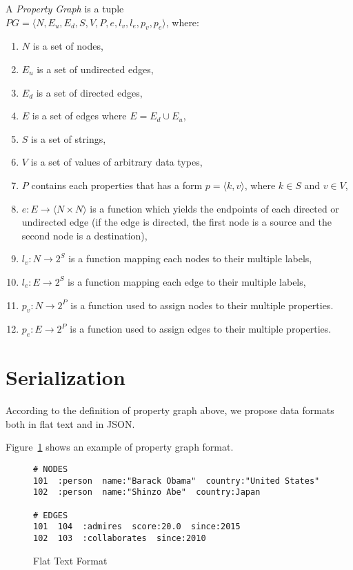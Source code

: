 \documentclass[runningheads]{llncs}
\begin{document}
\begin{defi}

A \emph{Property Graph} is a tuple  \\ 
$PG = \langle N, E_u, E_d, S, V, P, e, l_v, l_e, p_v, p_e\rangle$, where:
\begin{enumerate}
    \item $N$ is a set of nodes,
    \item $E_u$ is a set of undirected edges,
    \item $E_d$ is a set of directed edges,
    \item $E$ is a set of edges where $E = E_d \cup E_u$,
    \item $S$ is a set of strings,
    \item $V$ is a set of values of arbitrary data types,
    \item $P$ contains each properties that has a form $p = \langle k,v \rangle$, where $k \in S$ and $v \in V$,
    \item $e: E \to \langle N \times N \rangle$ is a function which yields the endpoints of each directed or undirected edge (if the edge is directed, the first node is a source and the second node is a destination),
    \item $l_v : N \to 2^S$ is a function mapping each nodes to their multiple labels,
    \item $l_e : E \to 2^S$ is a function mapping each edge to their multiple labels,
    \item $p_v : N \to 2^P$ is a function used to assign nodes to their multiple properties.
    \item $p_e : E \to 2^P$ is a function used to assign edges to their multiple properties.
\end{enumerate}
\end{defi}


\section{Serialization}
According to the definition of property graph above, we propose data formats both in flat text and in JSON.

Figure~\ref{fig:format-pg} shows an example of property graph format.

\begin{figure}[!t]
\vspace{2mm}
\begin{scriptsize}
\begin{verbatim}
# NODES
101  :person  name:"Barack Obama"  country:"United States"
102  :person  name:"Shinzo Abe"  country:Japan

# EDGES
101  104  :admires  score:20.0  since:2015
102  103  :collaborates  since:2010
\end{verbatim}
\end{scriptsize}
\caption{Flat Text Format}
\label{fig:format-pg}
\end{figure}
\end{document}

